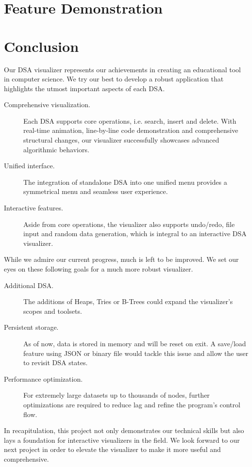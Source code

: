 \documentclass{article}
\begin{document}
\section{Feature Demonstration}

\section{Conclusion}
Our DSA visualizer represents our achievements in creating an educational tool in computer science. We try our best to develop a robust application that highlights the utmost important aspects of each DSA.
\begin{description}
	\item[Comprehensive visualization.] Each DSA supports core operations, i.e. search, insert and delete. With real-time animation, line-by-line code demonstration and comprehensive structural changes, our visualizer successfully showcases advanced algorithmic behaviors.
	\item[Unified interface.] The integration of standalone DSA into one unified menu provides a symmetrical menu and seamless user experience.
	\item[Interactive features.] Aside from core operations, the visualizer also supports undo/redo, file input and random data generation, which is integral to an interactive DSA visualizer.   
\end{description}
While we admire our current progress, much is left to be improved. We set our eyes on these following goals for a much more robust visualizer.
\begin{description}
	\item[Additional DSA.] The additions of Heaps, Tries or B-Trees could expand the visualizer's scopes and toolsets.
	\item[Persistent storage.] As of now, data is stored in memory and will be reset on exit. A save/load feature using JSON or binary file would tackle this issue and allow the user to revisit DSA states.
	\item[Performance optimization.] For extremely large datasets up to thousands of nodes, further optimizations are required to reduce lag and refine the program's control flow. 
\end{description}
In recapitulation, this project not only demonstrates our technical skills but also lays a foundation for interactive visualizers in the field. We look forward to our next project in order to elevate the visualizer to make it more useful and comprehensive.
\end{document}
